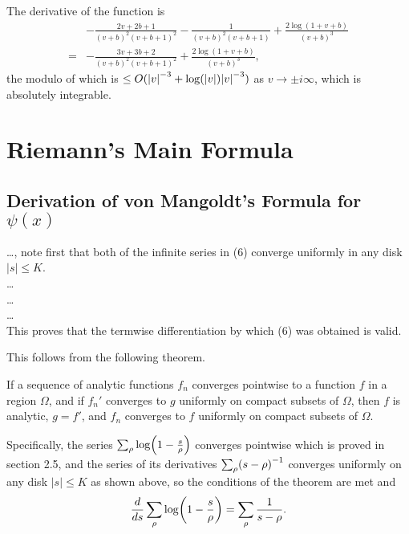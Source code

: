 \documentclass{note}
\numberwithin{equation}{chapter}
\begin{document}
The derivative of the function is
\begin{align*}
      & - \frac{2v + 2b + 1}{(v + b)^2(v + b + 1)^2}
    - \frac{1}{(v + b)^2 (v + b + 1)} + \frac{2\log(1 + v + b)}{(v + b)^3} \\
    = & - \frac{3v + 3b + 2}{(v + b)^2(v + b + 1)^2}
    + \frac{2\log(1 + v + b)}{(v + b)^3},
\end{align*}
the modulo of which is $\leq O(\abs{v}^{-3} + \log\prn{\abs{v}}\abs{v}^{-3})$
as $v \to \pm i\infty$, which is absolutely integrable.

\setcounter{chapter}{2}
\chapter{Riemann's Main Formula}

\setcounter{section}{1}
\section{Derivation of von Mangoldt's Formula for \texorpdfstring{$\psi(x)$}{ψ(x)}}


\begin{quotebar}
    \dots, note first that both of the infinite series in (6) converge uniformly in
    any disk \( |s| \leq K \).\\ \dots\\ \dots\\ \dots\\ This proves that the
    termwise differentiation by which (6) was obtained is valid.
\end{quotebar}

This follows from the following theorem.
\begin{theorem*}
    If a sequence of analytic functions \( f_n
    \) converges pointwise to a function \( f \) in a region \( \Omega \), and if
    \( f_n' \) converges to \( g \) uniformly on compact subsets of \( \Omega \),
    then \( f \) is analytic, \( g = f' \), and \( f_n \) converges to \( f \)
    uniformly on compact subsets of \( \Omega \).
\end{theorem*}

Specifically, the series $\sum_\rho\log\prn{1 - \frac{s}{\rho}}$ converges
pointwise which is proved in section 2.5, and the series of its derivatives
$\sum_\rho\prn{s - \rho}^{-1}$ converges uniformly on any disk $|s| \leq K$ as
shown above, so the conditions of the theorem are met and
\begin{equation*}
    \frac{d}{ds} \sum_\rho\log\prn{1 - \frac{s}{\rho}} = \sum_\rho\frac{1}{s -
        \rho}.
\end{equation*}
\end{document}
